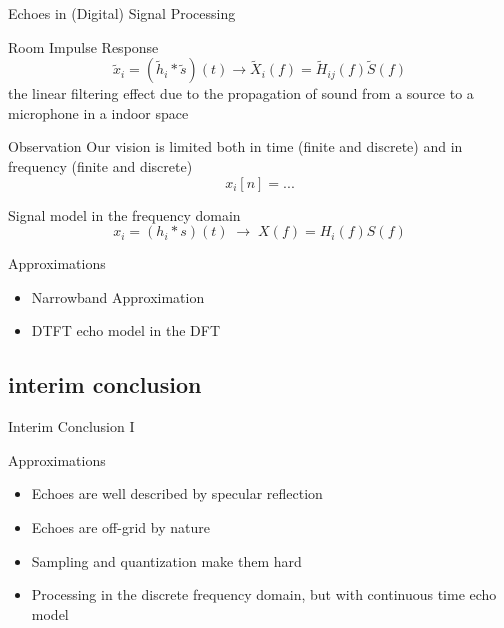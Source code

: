 \begin{frame}{Echoes in (Digital) Signal Processing}

    \begin{block}{Room Impulse Response}
        \begin{equation*}
            \tilde{x}_i = (\tilde{h}_i \ast \tilde{s})(t) \longrightarrow \tilde{X}_i( f) = \tilde{H}_{ij}( f) \tilde{S}( f)
        \end{equation*}
        the linear filtering effect due to the propagation of sound from a source to a microphone in a indoor space
    \end{block}

    \begin{block}{Observation}
        Our vision is limited both in time (finite and discrete) and in frequency (finite and discrete)
        \begin{equation}
            x_i[n] = ...
        \end{equation}
    \end{block}

    \begin{block}{Signal model in the frequency domain}
        \begin{equation*}
            x_i = (h_i \ast s)(t)\;\longrightarrow\;X(f) = H_i(f) S(f)
        \end{equation*}
    \end{block}

    \begin{block}{Approximations}
        \begin{itemize}
            \item Narrowband Approximation
            \item DTFT echo model in the DFT
        \end{itemize}
    \end{block}

\end{frame}

\subsection*{interim conclusion}
\begin{frame}{Interim Conclusion I}
    \begin{alertblock}{Approximations}
        \begin{itemize}
            \item Echoes are well described by specular reflection
            \item Echoes are off-grid by nature
            \item Sampling and quantization make them hard
            \item Processing in the discrete frequency domain, but with continuous time echo model
        \end{itemize}
    \end{alertblock}
\end{frame}
